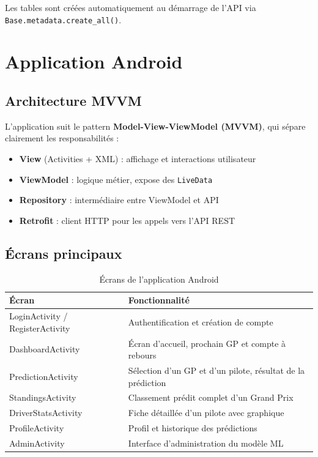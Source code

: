 \documentclass[12pt, a4paper]{article}
\begin{document}
Les tables sont créées automatiquement au démarrage de l'API via \texttt{Base.metadata.create\_all()}.

\section{Application Android}

\subsection{Architecture MVVM}

L'application suit le pattern \textbf{Model-View-ViewModel (MVVM)}, qui sépare clairement les responsabilités :

\begin{itemize}
    \item \textbf{View} (Activities + XML) : affichage et interactions utilisateur
    \item \textbf{ViewModel} : logique métier, expose des \texttt{LiveData}
    \item \textbf{Repository} : intermédiaire entre ViewModel et API
    \item \textbf{Retrofit} : client HTTP pour les appels vers l'API REST
\end{itemize}

\subsection{Écrans principaux}

\begin{table}[H]
\centering
\begin{tabularx}{\textwidth}{lX}
\toprule
\textbf{Écran} & \textbf{Fonctionnalité} \\
\midrule
LoginActivity / RegisterActivity & Authentification et création de compte \\
DashboardActivity                & Écran d'accueil, prochain GP et compte à rebours \\
PredictionActivity               & Sélection d'un GP et d'un pilote, résultat de la prédiction \\
StandingsActivity                & Classement prédit complet d'un Grand Prix \\
DriverStatsActivity              & Fiche détaillée d'un pilote avec graphique \\
ProfileActivity                  & Profil et historique des prédictions \\
AdminActivity                    & Interface d'administration du modèle ML \\
\bottomrule
\end{tabularx}
\caption{Écrans de l'application Android}
\end{table}
\end{document}
